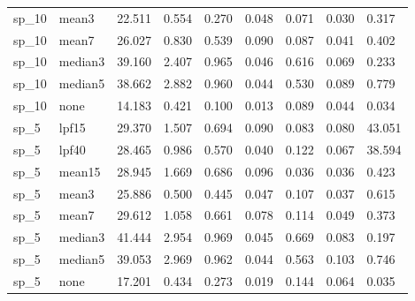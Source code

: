 \begin{table}[ht]
\begin{tabular}{lllllllll}
sp\_10 & mean3 & 22.511 & 0.554 & 0.270 & 0.048 & 0.071 & 0.030 & 0.317 \\
sp\_10 & mean7 & 26.027 & 0.830 & 0.539 & 0.090 & 0.087 & 0.041 & 0.402 \\
sp\_10 & median3 & 39.160 & 2.407 & 0.965 & 0.046 & 0.616 & 0.069 & 0.233 \\
sp\_10 & median5 & 38.662 & 2.882 & 0.960 & 0.044 & 0.530 & 0.089 & 0.779 \\
sp\_10 & none & 14.183 & 0.421 & 0.100 & 0.013 & 0.089 & 0.044 & 0.034 \\
sp\_5 & lpf15 & 29.370 & 1.507 & 0.694 & 0.090 & 0.083 & 0.080 & 43.051 \\
sp\_5 & lpf40 & 28.465 & 0.986 & 0.570 & 0.040 & 0.122 & 0.067 & 38.594 \\
sp\_5 & mean15 & 28.945 & 1.669 & 0.686 & 0.096 & 0.036 & 0.036 & 0.423 \\
sp\_5 & mean3 & 25.886 & 0.500 & 0.445 & 0.047 & 0.107 & 0.037 & 0.615 \\
sp\_5 & mean7 & 29.612 & 1.058 & 0.661 & 0.078 & 0.114 & 0.049 & 0.373 \\
sp\_5 & median3 & 41.444 & 2.954 & 0.969 & 0.045 & 0.669 & 0.083 & 0.197 \\
sp\_5 & median5 & 39.053 & 2.969 & 0.962 & 0.044 & 0.563 & 0.103 & 0.746 \\
sp\_5 & none & 17.201 & 0.434 & 0.273 & 0.019 & 0.144 & 0.064 & 0.035 \\
\bottomrule
\end{tabular}
\end{table}